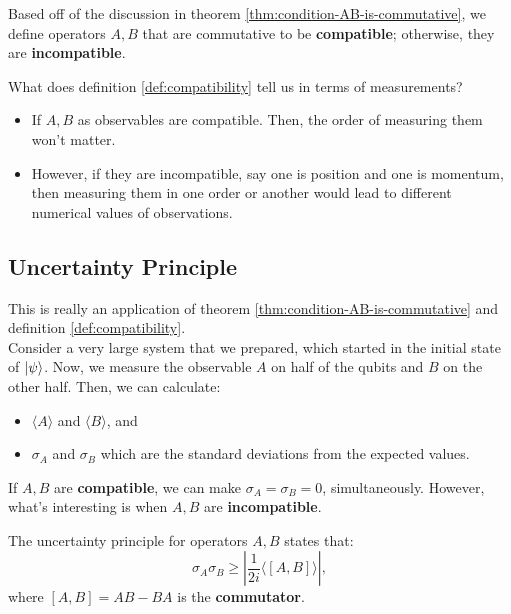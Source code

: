 \documentclass[12pt]{article}
\begin{document}
\begin{definition}[Compatible]\label{def:compatibility}
Based off of the discussion in theorem \ref{thm:condition-AB-is-commutative}, we define operators $A,B$ that are commutative to be \textbf{compatible}; otherwise, they are \textbf{incompatible}.
\end{definition}

\begin{remark}
What does definition \ref{def:compatibility} tell us in terms of measurements?
\begin{itemize}
    \item If $A,B$ as observables are compatible. Then, the order of measuring them won't matter.
    \item However, if they are incompatible, say one is position and one is momentum, then measuring them in one order or another would lead to different numerical values of observations.
\end{itemize}
\end{remark}

\subsection{Uncertainty Principle}
This is really an application of theorem \ref{thm:condition-AB-is-commutative} and definition \ref{def:compatibility}.\\

\noindent Consider a very large system that we prepared, which started in the initial state of $\Ket{\psi}$. Now, we measure the observable $A$ on half of the qubits and $B$ on the other half. Then, we can calculate:
\begin{itemize}
    \item $\langle A\rangle$ and $\langle B\rangle$, and
    \item $\sigma_A$ and $\sigma_B$ which are the standard deviations from the expected values.
\end{itemize}

\noindent If $A,B$ are \textbf{compatible}, we can make $\sigma_A = \sigma_B = 0$, simultaneously. However, what's interesting is when $A,B$ are \textbf{incompatible}.

\begin{theorem}
The uncertainty principle for operators $A,B$ states that: $$
\boxed{\sigma_A\sigma_B \geq \left| \frac{1}{2i}\langle [A,B] \rangle \right|},
$$ where $[A,B] = AB - BA$ is the \textbf{commutator}.
\end{theorem}
\end{document}
